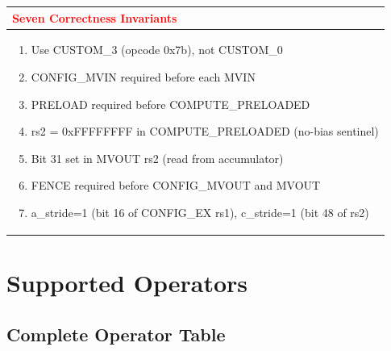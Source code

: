 \documentclass[12pt,a4paper]{article}
\newenvironment{warningbox}[1][Warning]{
    \begin{center}
    \begin{tabular}{|p{0.95\textwidth}|}
    \hline
    \textcolor{red}{\textbf{#1}} \\
    \hline
    \begin{minipage}{0.93\textwidth}
}{
    \end{minipage} \\
    \hline
    \end{tabular}
    \end{center}
}
\begin{document}
\begin{warningbox}[Seven Correctness Invariants]
\begin{enumerate}[leftmargin=*]
    \item Use CUSTOM\_3 (opcode 0x7b), not CUSTOM\_0
    \item CONFIG\_MVIN required before each MVIN
    \item PRELOAD required before COMPUTE\_PRELOADED
    \item rs2 = 0xFFFFFFFF in COMPUTE\_PRELOADED (no-bias sentinel)
    \item Bit 31 set in MVOUT rs2 (read from accumulator)
    \item FENCE required before CONFIG\_MVOUT and MVOUT
    \item a\_stride=1 (bit 16 of CONFIG\_EX rs1), c\_stride=1 (bit 48 of rs2)
\end{enumerate}
\end{warningbox}

\section{Supported Operators}

\subsection{Complete Operator Table}
\end{document}
